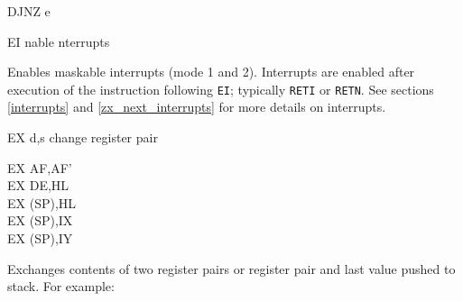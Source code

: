 \begin{basedescript}{
    \desclabelstyle{\multilinelabel}
    \desclabelwidth{3cm}}
\begin{DetailItem}{DJNZ e}
        \begin{DetailEffects}
            \FlagsDJNZ
        \end{DetailEffects}
				
        \begin{DetailTiming}
        \end{DetailTiming}

    \end{DetailItem}

    \begin{DetailItem}{EI}
        {nable nterrupts}
        {\SymEI}

        Enables maskable interrupts (mode 1 and 2). Interrupts are enabled after execution of the instruction following {\tt EI}; typically {\tt RETI} or {\tt RETN}. See sections \ref{interrupts} and \ref{zx_next_interrupts} for more details on interrupts.

        \begin{DetailEffects}
            \FlagsEI
        \end{DetailEffects}
				
        \begin{DetailTiming}
        \end{DetailTiming}

    \end{DetailItem}

    \pagebreak
    \begin{DetailItem}{EX d,s}
        {change register pair}
        {}

        \begin{DetailVariants}
            EX AF,AF'\\
            EX DE,HL\\

            \columnbreak
            EX (SP),HL\\
            EX (SP),IX\\
            EX (SP),IY
        \end{DetailVariants}

        Exchanges contents of two register pairs or register pair and last value pushed to stack. For example:


\end{DetailItem}
\end{basedescript}

